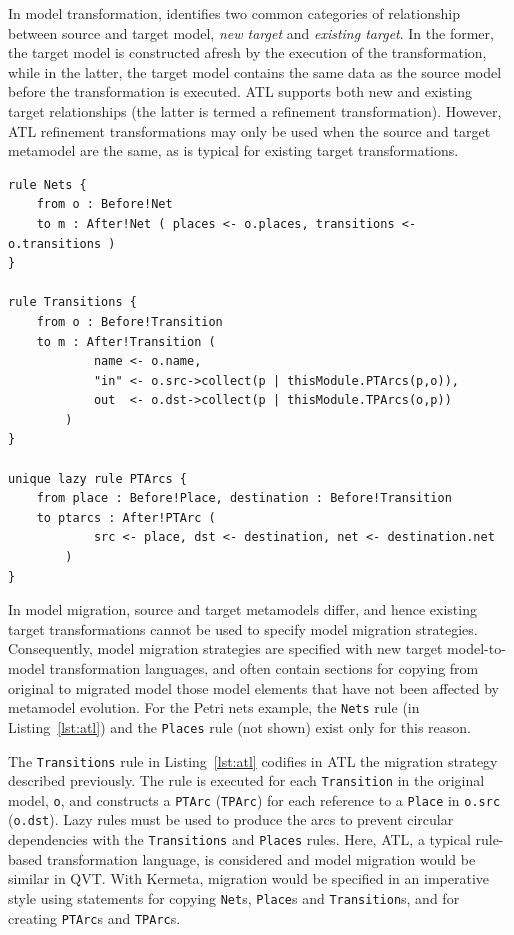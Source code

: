 In model transformation, \cite{czarnecki06survey} identifies two common categories of relationship between source and target model, \emph{new target} and \emph{existing target}. In the former, the target model is constructed afresh by the execution of the transformation, while in the latter, the target model contains the same data as the source model before the transformation is executed. ATL supports both new and existing target relationships (the latter is termed a refinement transformation). However, ATL refinement transformations may only be used when the source and target metamodel are the same, as is typical for existing target transformations. 

\begin{lstlisting}[caption=Fragment of the Petri nets model migration in ATL, label=lst:atl, language=ATL]
rule Nets {
	from o : Before!Net
	to m : After!Net ( places <- o.places, transitions <- o.transitions )
}

rule Transitions {
	from o : Before!Transition
	to m : After!Transition (
			name <- o.name,
			"in" <- o.src->collect(p | thisModule.PTArcs(p,o)),
			out  <- o.dst->collect(p | thisModule.TPArcs(o,p))
		)
}

unique lazy rule PTArcs {
	from place : Before!Place, destination : Before!Transition
	to ptarcs : After!PTArc (
			src <- place, dst <- destination, net <- destination.net
		)
}
\end{lstlisting}

In model migration, source and target metamodels differ, and hence existing target transformations cannot be used to specify model migration strategies. Consequently, model migration strategies are specified with new target model-to-model transformation languages, and often contain sections for copying from original to migrated model those model elements that have not been affected by metamodel evolution. For the Petri nets example, the \texttt{Nets} rule (in Listing~\ref{lst:atl}) and the \texttt{Places} rule (not shown) exist only for this reason.

The \texttt{Transitions} rule in Listing~\ref{lst:atl} codifies in ATL the migration strategy described previously. The rule is executed for each \texttt{Transition} in the original model, \texttt{o}, and constructs a \texttt{PTArc} (\texttt{TPArc}) for each reference to a \texttt{Place} in \texttt{o.src} (\texttt{o.dst}). Lazy rules must be used to produce the arcs to prevent circular dependencies with the \texttt{Transitions} and \texttt{Places} rules. Here, ATL, a typical rule-based transformation language, is considered and model migration would be similar in QVT. With Kermeta, migration would be specified in an imperative style using statements for copying \texttt{Net}s, \texttt{Place}s and \texttt{Transition}s, and for creating \texttt{PTArc}s and \texttt{TPArc}s.


